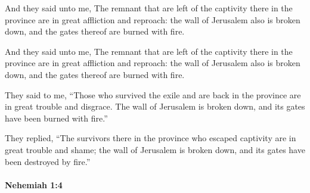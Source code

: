 			And they said unto me, The remnant that are left of the captivity there in the province are in great affliction and reproach: the wall of Jerusalem also is broken down, and the gates thereof are burned with fire.

			\begin{versebox}
					\item[BHS] 
					\item[LXX] 
					\item[ASV] And they said unto me, The remnant that are left of the captivity there in the province are in great affliction and reproach: the wall of Jerusalem also is broken down, and the gates thereof are burned with fire.
					\item[NIV] They said to me, “Those who survived the exile and are back in the province are in great trouble and disgrace. The wall of Jerusalem is broken down, and its gates have been burned with fire.”
					\item[NRSV] They replied, “The survivors there in the province who escaped captivity are in great trouble and shame; the wall of Jerusalem is broken down, and its gates have been destroyed by fire.”
			\end{versebox}

		\paragraph{Nehemiah 1:4} %
			\label{NEHEMIAH-1-4}

